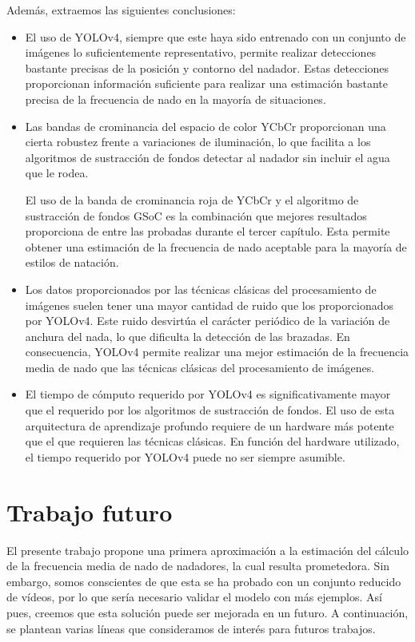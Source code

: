 Además, extraemos las siguientes conclusiones:
\begin{itemize}
    \item El uso de YOLOv4, siempre que este haya sido entrenado con un conjunto de imágenes lo suficientemente representativo, permite realizar detecciones bastante precisas de la posición y contorno del nadador. Estas detecciones proporcionan información suficiente para realizar una estimación bastante precisa de la frecuencia de nado en la mayoría de situaciones.
    
    \item Las bandas de crominancia del espacio de color YCbCr proporcionan una cierta robustez frente a variaciones de iluminación, lo que facilita a los algoritmos de sustracción de fondos detectar al nadador sin incluir el agua que le rodea.
    
    El uso de la banda de crominancia roja de YCbCr y el algoritmo de sustracción de fondos GSoC es la combinación que mejores resultados proporciona de entre las probadas durante el tercer capítulo.
    Esta permite obtener una estimación de la frecuencia de nado aceptable para la mayoría de estilos de natación.
    
    \item Los datos proporcionados por las técnicas clásicas del procesamiento de imágenes suelen tener una mayor cantidad de ruido que los proporcionados por YOLOv4. Este ruido desvirtúa el carácter periódico de la variación de anchura del nada, lo que dificulta la detección de las brazadas. En consecuencia, YOLOv4 permite realizar una mejor estimación de la frecuencia media de nado que las técnicas clásicas del procesamiento de imágenes.
    
    \item El tiempo de cómputo requerido por YOLOv4 es significativamente mayor que el requerido por los algoritmos de sustracción de fondos. El uso de esta arquitectura de aprendizaje profundo requiere de un hardware más potente que el que requieren las técnicas clásicas. En función del hardware utilizado, el tiempo requerido por YOLOv4 puede no ser siempre asumible. 
    
\end{itemize}

\section{Trabajo futuro}

El presente trabajo propone una primera aproximación a la estimación del cálculo de la frecuencia media de nado de nadadores, la cual resulta prometedora. Sin embargo, somos conscientes de que esta se ha probado con un conjunto reducido de vídeos, por lo que sería necesario validar el modelo con más ejemplos. Así pues, creemos que esta solución puede ser mejorada en un futuro. A continuación, se plantean varias líneas que consideramos de interés para futuros trabajos.

